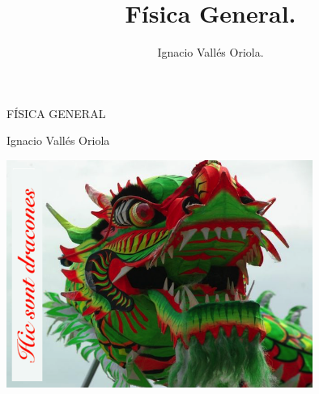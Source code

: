 \documentclass[a4paper, 12pt, spanish]{book}
\title{Física General.}
\author{Ignacio Vallés Oriola.}
\date{}
\numberwithin{equation}{chapter}
\numberwithin{teor}{chapter}
\numberwithin{coro}{chapter}
\numberwithin{prop}{chapter}
\numberwithin{defi}{chapter}
\numberwithin{axio}{chapter}
\numberwithin{ejem}{chapter}
\numberwithin{ejer}{chapter}
\numberwithin{ejre}{chapter}
\numberwithin{ayud}{chapter}
\numberwithin{solu}{chapter}
\numberwithin{prob}{chapter}
\begin{document}
\begin{titlepage}
	\centering
	\vspace*{\fill}
	{\scshape\LARGE FÍSICA GENERAL\par}
	\vspace{1cm}
	{\Large Ignacio Vallés Oriola \par}
	\vspace{3cm}
	\includegraphics[width=0.75\textwidth]{imagenes/hic-svnt-dracones}
	\vspace{3cm}
\end{titlepage}

\tableofcontents






























\appendix

		
\end{document}
